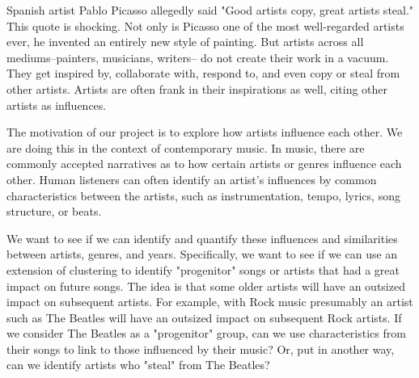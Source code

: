 Spanish artist Pablo Picasso allegedly said "Good artists copy, great artists steal."
This quote is shocking.
Not only is Picasso one of the most
well-regarded artists ever, he invented an entirely new style of painting.
But artists across all mediums--painters, musicians, writers--
do not create their work in a vacuum.
They get inspired by, collaborate with, respond to, and even copy or steal from other artists.
Artists are often frank in their inspirations as well, citing other artists as influences.

The motivation of our project is to explore how artists influence each other.
We are doing this in the context of contemporary music.
In music, there are commonly accepted narratives as to how certain artists or genres
influence each other.
Human listeners can often identify an artist's influences by common
characteristics between the artists, such as instrumentation, tempo, lyrics, song structure,
or beats.

We want to see if we can identify and quantify these influences and similarities
between artists, genres, and years.
Specifically, we want to see if we can use an extension of clustering to identify "progenitor" songs or artists
that had a great impact on future songs.
The idea is that some older artists will have an outsized impact on subsequent artists.
For example, with Rock music presumably an artist such as The Beatles
will have an outsized impact on subsequent Rock artists.
If we consider The Beatles as a "progenitor" group,
can we use characteristics from their songs to link to those influenced by their music?
Or, put in another way, can we identify artists who "steal" from The Beatles?
